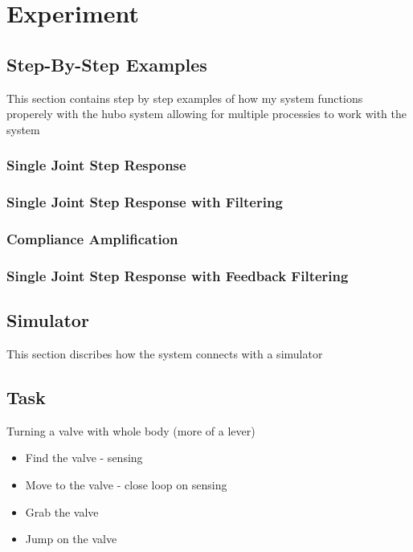 \chapter{Experiment}
\section{Step-By-Step Examples}\label{sec:simpleExamples}
This section contains step by step examples of how my system functions properely with the hubo system allowing for multiple processies to work with the system

	\subsection{Single Joint Step Response}\label{sec:singlejointStep}
		
	\subsection{Single Joint Step Response with Filtering}\label{sec:singlejointFilter}
		
	\subsection{Compliance Amplification}\label{sec:singlejointRefComplience}
		
	\subsection{Single Joint Step Response with Feedback Filtering}\label{sec:singlejointEnc}
		


\section{Simulator}\label{sec:simulator}
This section discribes how the system connects with a simulator 


\section{Task}\label{sec:task}
Turning a valve with whole body (more of a lever)
\begin{itemize}
\item Find the valve - sensing
\item Move to the valve - close loop on sensing
\item Grab the valve
\item Jump on the valve
\end{itemize}



